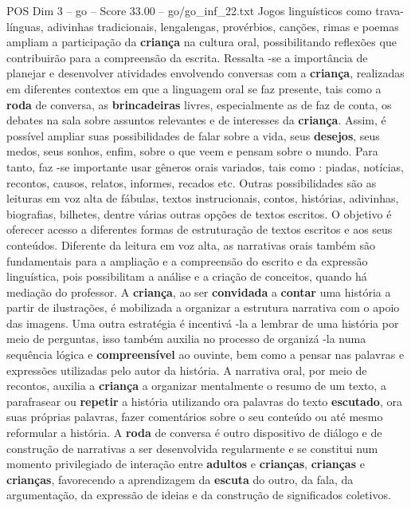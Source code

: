 \begin{textsample}{POS Dim 3 – go – Score 33.00 – go/go\_inf\_22.txt}
Jogos linguísticos como trava-línguas, adivinhas tradicionais, lengalengas, provérbios, canções, rimas e poemas ampliam a participação da \textbf{criança} na cultura oral, possibilitando reflexões que contribuirão para a compreensão da escrita.
Ressalta -se a importância de planejar e desenvolver atividades envolvendo conversas com a \textbf{criança}, realizadas em diferentes contextos em que a linguagem oral se faz presente, tais como a \textbf{roda} de conversa, as \textbf{brincadeiras} livres, especialmente as de faz de conta, os debates na sala sobre assuntos relevantes e de interesses da \textbf{criança}.
Assim, é possível ampliar suas possibilidades de falar sobre a vida, seus \textbf{desejos}, seus medos, seus sonhos, enfim, sobre o que veem e pensam sobre o mundo.
Para tanto, faz -se importante usar gêneros orais variados, tais como : piadas, notícias, recontos, causos, relatos, informes, recados etc.
Outras possibilidades são as leituras em voz alta de fábulas, textos instrucionais, contos, histórias, adivinhas, biografias, bilhetes, dentre várias outras opções de textos escritos.
O objetivo é oferecer acesso a diferentes formas de estruturação de textos escritos e aos seus conteúdos.
Diferente da leitura em voz alta, as narrativas orais também são fundamentais para a ampliação e a compreensão do escrito e da expressão linguística, pois possibilitam a análise e a criação de conceitos, quando há mediação do professor.
A \textbf{criança}, ao ser \textbf{convidada} a \textbf{contar} uma história a partir de ilustrações, é mobilizada a organizar a estrutura narrativa com o apoio das imagens.
Uma outra estratégia é incentivá -la a lembrar de uma história por meio de perguntas, isso também auxilia no processo de organizá -la numa sequência lógica e \textbf{compreensível} ao ouvinte, bem como a pensar nas palavras e expressões utilizadas pelo autor da história.
A narrativa oral, por meio de recontos, auxilia a \textbf{criança} a organizar mentalmente o resumo de um texto, a parafrasear ou \textbf{repetir} a história utilizando ora palavras do texto \textbf{escutado}, ora suas próprias palavras, fazer comentários sobre o seu conteúdo ou até mesmo reformular a história.
A \textbf{roda} de conversa é outro dispositivo de diálogo e de construção de narrativas a ser desenvolvida regularmente e se constitui num momento privilegiado de interação entre \textbf{adultos} e \textbf{crianças}, \textbf{crianças} e \textbf{crianças}, favorecendo a aprendizagem da \textbf{escuta} do outro, da fala, da argumentação, da expressão de ideias e da construção de significados coletivos.

\end{textsample}

